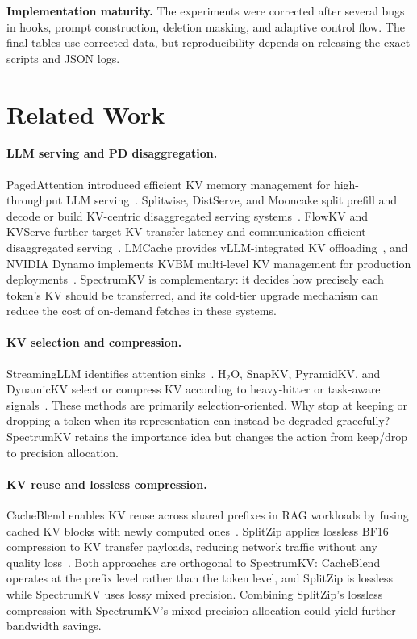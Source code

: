 \documentclass[11pt]{article}
\newcommand{\method}{SpectrumKV}
\theoremstyle{plain}
\theoremstyle{definition}
\begin{document}
\textbf{Implementation maturity.}  The experiments were corrected after several bugs in hooks, prompt construction, deletion masking, and adaptive control flow.  The final tables use corrected data, but reproducibility depends on releasing the exact scripts and JSON logs.

\section{Related Work}
\label{sec:related}

\paragraph{LLM serving and PD disaggregation.}
PagedAttention introduced efficient KV memory management for high-throughput LLM serving~\citep{pagedattention}.  Splitwise, DistServe, and Mooncake split prefill and decode or build KV-centric disaggregated serving systems~\citep{splitwise,distserve,mooncake}.  FlowKV and KVServe further target KV transfer latency and communication-efficient disaggregated serving~\citep{flowkv,kvserve}.  LMCache provides vLLM-integrated KV offloading~\citep{lmcache}, and NVIDIA Dynamo implements KVBM multi-level KV management for production deployments~\citep{nvidiadynamo}.  \method{} is complementary: it decides how precisely each token's KV should be transferred, and its cold-tier upgrade mechanism can reduce the cost of on-demand fetches in these systems.

\paragraph{KV selection and compression.}
StreamingLLM identifies attention sinks~\citep{streamingllm}.  H$_2$O, SnapKV, PyramidKV, and DynamicKV select or compress KV according to heavy-hitter or task-aware signals~\citep{h2o,snapkv,pyramidkv,dynamickv}.  These methods are primarily selection-oriented.  Why stop at keeping or dropping a token when its representation can instead be degraded gracefully?  \method{} retains the importance idea but changes the action from keep/drop to precision allocation.

\paragraph{KV reuse and lossless compression.}
CacheBlend enables KV reuse across shared prefixes in RAG workloads by fusing cached KV blocks with newly computed ones~\citep{cacheblend}.  SplitZip applies lossless BF16 compression to KV transfer payloads, reducing network traffic without any quality loss~\citep{splitzip}.  Both approaches are orthogonal to \method{}: CacheBlend operates at the prefix level rather than the token level, and SplitZip is lossless while \method{} uses lossy mixed precision.  Combining SplitZip's lossless compression with \method{}'s mixed-precision allocation could yield further bandwidth savings.
\end{document}
